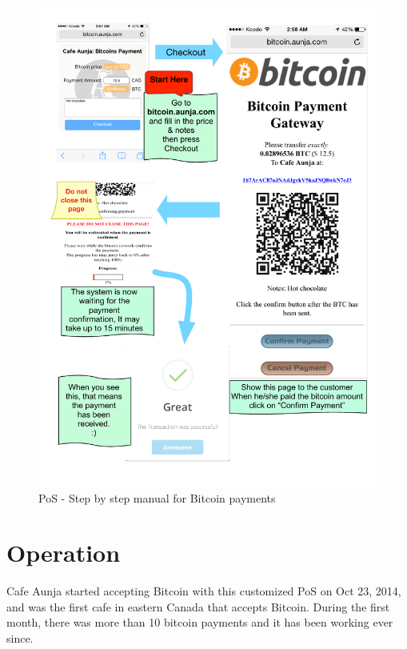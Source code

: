 \begin{figure}[h]
\centering
\includegraphics[width=\linewidth]{fig/Payment_manual.pdf}
  \caption{PoS - Step by step manual for Bitcoin payments}
\label{fig:payment_manual}
\end{figure}



\section{Operation}
Cafe Aunja started accepting Bitcoin with this customized PoS on Oct 23, 2014, and was the first cafe in eastern Canada that accepts Bitcoin. During the first month, there was more than 10 bitcoin payments and it has been working ever since.


